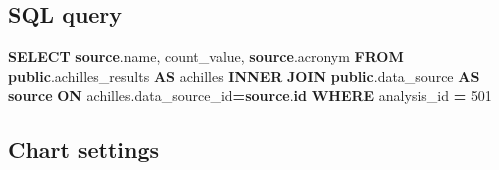 \documentclass[
]{book}
\newenvironment{Shaded}{\begin{snugshade}}{\end{snugshade}}
\newcommand{\DecValTok}[1]{\textcolor[rgb]{0.00,0.00,0.81}{#1}}
\newcommand{\KeywordTok}[1]{\textcolor[rgb]{0.13,0.29,0.53}{\textbf{#1}}}
\newcommand{\NormalTok}[1]{#1}
\newcommand{\OperatorTok}[1]{\textcolor[rgb]{0.81,0.36,0.00}{\textbf{#1}}}
\begin{document}
\hypertarget{sql-query-20}{%
\subsection{SQL query}\label{sql-query-20}}

\begin{Shaded}
\begin{Highlighting}[]
\KeywordTok{SELECT} \KeywordTok{source}\NormalTok{.name,}
\NormalTok{    count\_value,}
    \KeywordTok{source}\NormalTok{.acronym}
\KeywordTok{FROM} \KeywordTok{public}\NormalTok{.achilles\_results }\KeywordTok{AS}\NormalTok{ achilles}
\KeywordTok{INNER} \KeywordTok{JOIN} \KeywordTok{public}\NormalTok{.data\_source }\KeywordTok{AS} \KeywordTok{source} \KeywordTok{ON}\NormalTok{ achilles.data\_source\_id}\OperatorTok{=}\KeywordTok{source}\NormalTok{.}\KeywordTok{id}
\KeywordTok{WHERE}\NormalTok{ analysis\_id }\OperatorTok{=} \DecValTok{501}
\end{Highlighting}
\end{Shaded}

\hypertarget{chart-settings-20}{%
\subsection{Chart settings}\label{chart-settings-20}}
\end{document}
